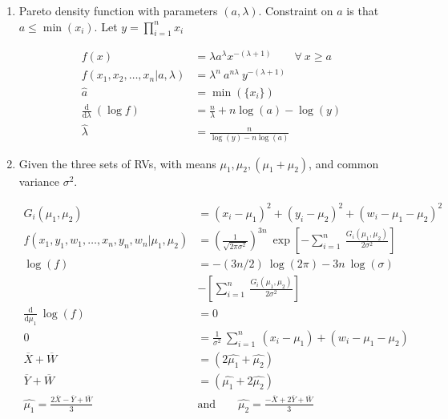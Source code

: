 \begin{enumerate}
	\item Pareto density function with parameters $ (a, \lambda) $. Constraint on $ a $ is that $ a \leq \min({x_i}) $.
	Let $ y = \prod\limits_{i=1}^{n} x_i $
	
	
		\begin{align}
			f(x) &= \lambda a^\lambda x^{-(\lambda+1)} \qquad \forall\ x \geq a \nonumber \\
			f(x_1, x_2, \dots, x_n | a, \lambda) &= \lambda^n\ a^{n\lambda}\ y^{-(\lambda + 1)} \\
			\widehat{a} &= \min(\{x_i\}) \\
			\frac{\mathrm{d}}{\mathrm{d} \lambda}\ (\log f) &= \frac{n}{\lambda} + n \log (a) - \log (y) \nonumber \\
			\widehat{\lambda} &= \frac{n}{\log (y) - n \log (a)}
		\end{align}
	
	
	\item Given the three sets of RVs, with means $ \mu_1, \mu_2, (\mu_1 + \mu_2) $, and common variance $ \sigma^2 $.
	
	
		\begin{align}
			G_i(\mu_1, \mu_2) &= (x_i - \mu_1)^2 + (y_i - \mu_2)^2 + (w_i - \mu_1 - \mu_2)^2 \nonumber \\
			f(x_1, y_1,w_1, \dots, x_n, y_n, w_n | \mu_1, \mu_2) &= \left(\frac{1}{\sqrt{2\pi\sigma^2}}\right)^{3n}\ \exp \left[-\sum\limits_{i=1}^{n}\ \frac{G_i(\mu_1, \mu_2)}{2\sigma^2}\right] \nonumber \\
			\log(f) &= -(3n/2)\ \log(2\pi) - 3n\ \log(\sigma) \nonumber \\
			&- \left[\sum\limits_{i=1}^{n}\ \frac{G_i(\mu_1, \mu_2)}{2\sigma^2}\right] \\
			\frac{\mathrm{d}}{\mathrm{d} \mu_1}\ \log(f) &= 0 \nonumber \\
			0 &= \frac{1}{\sigma^2}\ \sum\limits_{i=1}^{n}\ (x_i - \mu_1) + (w_i - \mu_1 - \mu_2) \nonumber \\
			\overline{X} + \overline{W} &= (2\widehat{\mu_1} + \widehat{\mu_2}) \\
			\overline{Y} + \overline{W} &= (\widehat{\mu_1} + 2\widehat{\mu_2}) \nonumber \\
			\widehat{\mu_1} = \frac{2\overline{X} - \overline{Y} + \overline{W}}{3} \qquad &\text{and} \qquad \widehat{\mu_2} = \frac{-\overline{X} + 2\overline{Y} + \overline{W}}{3}
		\end{align}
	

\end{enumerate}
